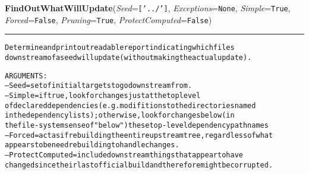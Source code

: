 \hspace{.8\funcindent}\begin{boxedminipage}{\funcwidth}

    \raggedright \textbf{FindOutWhatWillUpdate}(\textit{Seed}={\tt ['../']}, \textit{Exceptions}={\tt None}, \textit{Simple}={\tt True}, \textit{Forced}={\tt False}, \textit{Pruning}={\tt True}, \textit{ProtectComputed}={\tt False})

    \vspace{-1.5ex}

    \rule{\textwidth}{0.5\fboxrule}
\setlength{\parskip}{2ex}
\begin{alltt}

Determine and print out readable report indicating which files 
downstream of a seed will update (without making the actual update). 

ARGUMENTS:
--Seed = set of initial targets to go downstream from.  
--Simple = if true, look for changes just at the top level 
        of declared dependencies (e.g. modifitions to the directories named
        in the dependency lists);  otherwise, look for changes below (in 
        the file-system sense of "below") these top-level dependency path names
--Forced = act as if rebuilding the entire upstream tree, regardless of what 
        appears to be need rebuilding to handle changes. 
--ProtectComputed = include downstream things that appear to have 
        changed since their last official build and therefore might be corrupted.
\end{alltt}

\setlength{\parskip}{1ex}
    \end{boxedminipage}

    \label{System:Update:LinkUpdate}

    \vspace{0.5ex}

